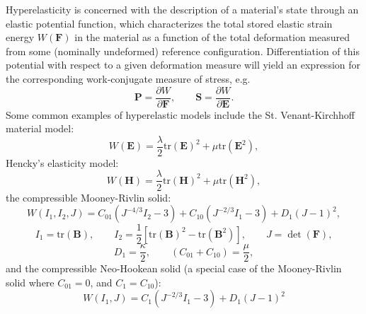 Hyperelasticity is concerned with the description of a material's state through an elastic potential function, which characterizes the total stored elastic strain energy $W (\mathbf{F})$ in the material as a function of the total deformation measured from some (nominally undeformed) reference configuration. Differentiation of this potential with respect to a given deformation measure will yield an expression for the corresponding work-conjugate measure of stress, e.g.
\begin{equation}
  \mathbf{P} = \frac{\partial W}{\partial \mathbf{F}}, \qquad \mathbf{S} = \frac{\partial W}{\partial \mathbf{E}}.
\end{equation}
Some common examples of hyperelastic models include the St. Venant-Kirchhoff material model:
\begin{equation}
  W (\mathbf{E}) = \frac{\lambda}{2} \text{tr} (\mathbf{E})^2 + \mu \text{tr} (\mathbf{E}^2),
\end{equation}
Hencky's elasticity model:
\begin{equation}
  W (\mathbf{H}) = \frac{\lambda}{2} \text{tr} (\mathbf{H})^2 + \mu \text{tr} (\mathbf{H}^2),
\end{equation}
the compressible Mooney-Rivlin solid:
\begin{equation}
  W (I_1, I_2, J) = C_{01} (J^{-4/3} I_2 - 3) + C_{10} (J^{-2/3} I_1 - 3) + D_1 (J - 1)^2,
\end{equation}
\begin{equation}
  I_1 = \text{tr} (\mathbf{B}), \qquad I_2 = \frac{1}{2} \left[ \text{tr} (\mathbf{B})^2 - \text{tr} (\mathbf{B}^2) \right], \qquad J = \det (\mathbf{F}),
\end{equation}
\begin{equation}
  D_1 = \frac{\kappa}{2}, \qquad (C_{01} + C_{10}) = \frac{\mu}{2},
\end{equation}
and the compressible Neo-Hookean solid (a special case of the Mooney-Rivlin solid where $C_{01} = 0$, and $C_1 = C_{10}$):
\begin{equation}
  W (I_1, J) = C_1 (J^{-2/3} I_1 - 3) + D_1 (J - 1)^2
\end{equation}

